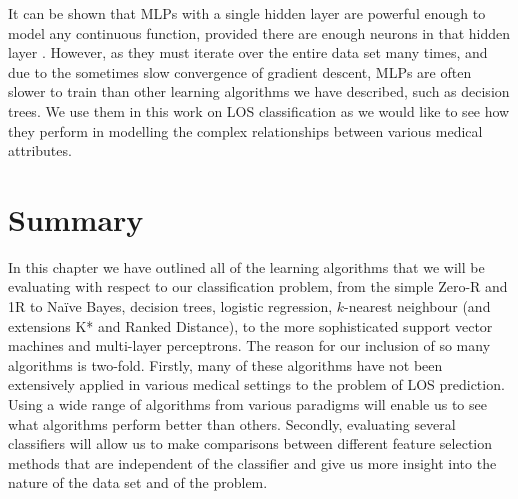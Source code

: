 It can be shown that MLPs with a single hidden layer are powerful enough to
model any continuous function, provided there are enough neurons in that
hidden layer \cite{Hand2001}. However, as they must iterate over the entire
data set many times, and due to the sometimes slow convergence of gradient
descent, MLPs are often slower to train than other learning algorithms we
have described, such as decision trees. We use them in this work on LOS
classification as we would like to see how they perform in modelling the
complex relationships between various medical attributes.

\section{Summary}
In this chapter we have outlined all of the learning algorithms that we will
be evaluating with respect to our classification problem, from the simple
Zero-R and 1R to Na\"{i}ve Bayes, decision trees, logistic regression,
$k$-nearest neighbour (and extensions K* and Ranked Distance), to the more
sophisticated support vector machines and multi-layer perceptrons. The reason
for our inclusion of so many algorithms is two-fold. Firstly, many of
these algorithms have not been extensively applied in various medical settings
to the problem of LOS prediction. Using a wide range of algorithms from various
paradigms will enable us to see what algorithms perform better than others.
Secondly, evaluating several classifiers will allow us to make comparisons
between different feature selection methods that are independent of the
classifier and give us more insight into the nature of the data set and of the
problem.
